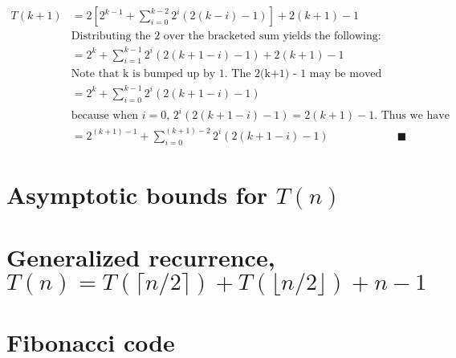 \documentclass[11pt]{article}
\begin{document}
\begin{itemize}
\begin{align*}
T(k+1) &= 2 \left [ 2^{k-1} + \sum_{i=0}^{k-2} 2^{i} (2(k-i) - 1) \right ] + 2(k+1) - 1 \\
& \text{Distributing the 2 over the bracketed sum yields the following:} & \\
&= 2^{k} + \sum_{i=1}^{k-1} 2^{i} (2(k+1-i) - 1) + 2(k+1) - 1 & \\
&  \text{Note that k is bumped up by 1. The  2(k+1) - 1 may be moved into the sum} & \\
&= 2^{k} + \sum_{i=0}^{k-1} 2^{i} (2(k+1-i) - 1) & \\
& \text{because when $i = 0$, $2^{i} (2(k+1-i) - 1) = 2(k+1) - 1$. Thus we have} & \\
&= 2^{(k+1) - 1} + \sum_{i=0}^{(k+1)-2} 2^{i} (2(k+1-i) - 1) &
\blacksquare
\end{align*}
\end{itemize}

\section{Asymptotic bounds for $T(n)$}
\section{Generalized recurrence, $T(n) = T( \lceil n/2 \rceil ) + T( \lfloor n/2 \rfloor ) + n - 1$ }
\newpage
\section{Fibonacci code} \label{fibcode}
\end{document}
